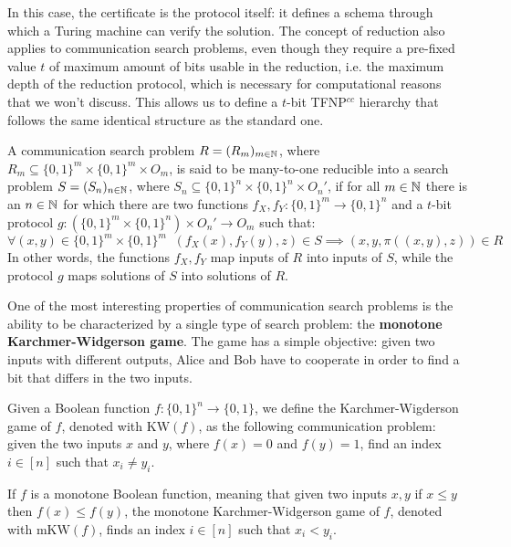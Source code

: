 In this case, the certificate is the protocol itself: it defines a schema through which a Turing machine can verify the solution. The concept of reduction also applies to communication search problems, even though they require a pre-fixed value $t$ of maximum amount of bits usable in the reduction, i.e. the maximum depth of the reduction protocol, which is necessary for computational reasons that we won't discuss. This allows us to define a $t$-bit \textsf{TFNP}$^{cc}$ hierarchy that follows the same identical structure as the standard one.

\begin{definition}
    A communication search problem $R = (R_m)_{m \in \mathbb{N}}$, where $R_m \subseteq \{0,1\}^m \times \{0,1\}^m \times O_m$, is said to be many-to-one reducible into a search problem $S = (S_n)_{n \in \mathbb{N}}$, where $S_n \subseteq \{0,1\}^n \times \{0,1\}^n \times O_n'$, if for all $m \in \mathbb{N}$ there is an $n \in \mathbb{N}$ for which there are two functions $f_X, f_Y : \{0,1\}^m \to \{0,1\}^n$ and a $t$-bit protocol $g : (\{0,1\}^m \times \{0,1\}^n) \times O_n' \to O_m$ such that:
    \[\forall (x,y) \in \{0,1\}^m \times \{0,1\}^m \;\; (f_X(x), f_Y(y), z) \in S \implies (x, y, \pi((x,y), z)) \in R\]
    In other words, the functions $f_X,f_Y$ map inputs of $R$ into inputs of $S$, while the protocol $g$ maps solutions of $S$ into solutions of $R$. 
\end{definition}

One of the most interesting properties of communication search problems is the ability to be characterized by a single type of search problem: the \textbf{monotone Karchmer-Widgerson game}. The game has a simple objective: given two inputs with different outputs, Alice and Bob have to cooperate in order to find a bit that differs in the two inputs.

\begin{definition}
    Given a Boolean function $f : \{0, 1\}^n \to \{0, 1\}$, we define the Karchmer-Wigderson game of $f$, denoted with $\mathrm{KW}(f)$, as the following communication problem: given the two inputs $x$ and $y$, where $f(x) = 0$ and $f(y) = 1$, find an index $i \in [n]$ such that $x_i \neq y_i$.

    If $f$ is a monotone Boolean function, meaning that given two inputs $x,y$ if $x \leq y$ then $f(x) \leq f(y)$, the monotone Karchmer-Widgerson game of $f$, denoted with $\mathrm{mKW}(f)$, finds an index $i \in [n]$ such that $x_i < y_i$.
\end{definition}

